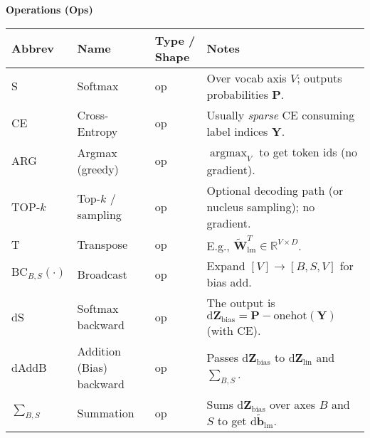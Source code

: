 \documentclass{article}
\begin{document}
\begin{center}
\textbf{Operations (Ops)}
\begin{tabular}{llll}
\hline
\textbf{Abbrev} & \textbf{Name} & \textbf{Type / Shape} & \textbf{Notes} \\
\hline
S     & Softmax                     & op            & Over vocab axis $V$; outputs probabilities $\mathbf{P}$. \\
CE    & Cross-Entropy               & op            & Usually \emph{sparse} CE consuming label indices $\mathbf{Y}$. \\
ARG   & Argmax (greedy)             & op            & $\operatorname*{argmax}_V$ to get token ids (no gradient). \\
TOP-$k$ & Top-$k$ / sampling        & op            & Optional decoding path (or nucleus sampling); no gradient. \\
T     & Transpose                   & op            & E.g., $\widetilde{\mathbf{W}}_{\text{lm}}^{T} \in \mathbb{R}^{V\times D}$. \\
$\mathrm{BC}_{B,S}(\cdot)$ & Broadcast & op       & Expand $[V] \!\to\! [B,S,V]$ for bias add. \\
dS    & Softmax backward            & op            & The output is $\mathrm{d}\mathbf{Z}_{\text{bias}} = \mathbf{P}-\text{onehot}(\mathbf{Y})$ (with CE). \\
dAddB & Addition (Bias) backward & op            & Passes $\mathrm{d}\mathbf{Z}_{\text{bias}}$ to $\mathrm{d}\mathbf{Z}_{\text{lin}}$ and $\sum_{B,S}$.\\
$\sum_{B,S}$ & Summation            & op            & Sums $\mathrm{d}\mathbf{Z}_{\text{bias}}$ over axes $B$ and $S$ to get $\mathrm{d}\widetilde{\mathbf{b}}_{\text{lm}}$.\\
\hline
\end{tabular}
\end{center}

\vspace{0.8em}
\end{document}
